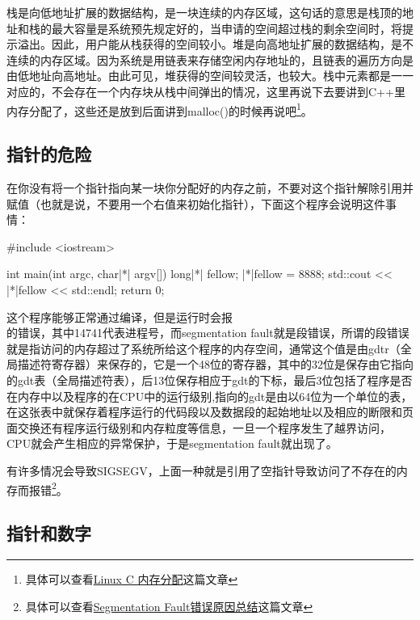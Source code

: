 栈是向低地址扩展的数据结构，是一块连续的内存区域，这句话的意思是栈顶的地址和栈的最大容量是系统预先规定好的，当申请的空间超过栈的剩余空间时，将提示溢出。因此，用户能从栈获得的空间较小。堆是向高地址扩展的数据结构，是不连续的内存区域。因为系统是用链表来存储空闲内存地址的，且链表的遍历方向是由低地址向高地址。由此可见，堆获得的空间较灵活，也较大。栈中元素都是一一对应的，不会存在一个内存块从栈中间弹出的情况，这里再说下去要讲到C++里内存分配了，这些还是放到后面讲到malloc()的时候再说吧\footnote{具体可以查看\thinspace\href{https://www.cnblogs.com/zhaoosheLBJ/p/9281253.html}{Linux C 内存分配}这篇文章}。

\subsection{指针的危险}

在你没有将一个指针指向某一块你分配好的内存之前，不要对这个指针解除引用并赋值（也就是说，不要用一个右值来初始化指针），下面这个程序会说明这件事情：

\begin{cpp}
#include <iostream>

int main(int argc, char|*| argv[]) {
    long|*| fellow;
    |*|fellow = 8888;
    std::cout << |*|fellow << std::endl;
    return 0;
}
\end{cpp}

这个程序能够正常通过编译，但是运行时会报\\ 的错误，其中14741代表进程号，而segmentation fault就是段错误，所谓的段错误就是指访问的内存超过了系统所给这个程序的内存空间，通常这个值是由gdtr（全局描述符寄存器）来保存的，它是一个48位的寄存器，其中的32位是保存由它指向的gdt表（全局描述符表），后13位保存相应于gdt的下标，最后3位包括了程序是否在内存中以及程序的在CPU中的运行级别,指向的gdt是由以64位为一个单位的表，在这张表中就保存着程序运行的代码段以及数据段的起始地址以及相应的断限和页面交换还有程序运行级别和内存粒度等信息，一旦一个程序发生了越界访问，CPU就会产生相应的异常保护，于是segmentation fault就出现了。

有许多情况会导致SIGSEGV，上面一种就是引用了空指针导致访问了不存在的内存而报错\footnote{具体可以查看\thinspace\href{https://www.cnblogs.com/qiumingcheng/p/11254648.html}{Segmentation Fault错误原因总结}这篇文章}。

\subsection{指针和数字}


